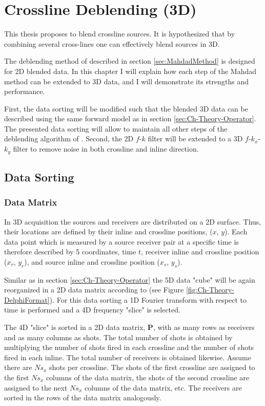 \chapter{Crossline Deblending (3D)} \label{chap:MahdadMethod3d}

This thesis proposes to blend crossline sources. It is hypothesized that by combining several cross-lines one can effectively blend sources in 3D.

The deblending method of \citet{Mahdad-Deblending-Method} described in section \ref{sec:MahdadMethod} is designed for 2D blended data. In this chapter I will explain how each step of the Mahdad method can be extended to 3D data, and I will demonstrate its strengths and  performance.

First, the data sorting will be modified such that the blended 3D data can be described using the same forward model as in section \ref{sec:Ch-Theory-Operator}. The presented data sorting will allow to maintain all other steps of the deblending algorithm of \citet{Mahdad-Deblending-Method}. Second, the 2D $f$-$k$ filter will be extended to a 3D $f$-$k_x$-$k_y$ filter to remove noise in both crossline and inline direction.

\section{Data Sorting} \label{sec:Ch-Theory-3dExtension-DataSorting}

\subsection*{Data Matrix}

In 3D acquisition the sources and receivers are distributed on a 2D surface. Thus, their locations are defined by their inline and crossline positions, ($x$, $y$). Each data point which is measured by a source receiver pair at a specific time is therefore described by 5 coordinates, time $t$, receiver inline and crossline position ($x_r$, $y_r$), and source inline and crossline position ($x_s$, $y_s$).

Similar as in section \ref{sec:Ch-Theory-Operator} the 5D data "cube" will be again reorganized in a 2D data matrix according to \citet{Delphi-Format} (see Figure \ref{fig:Ch-Theory-DelphiFormat}). For this data sorting a 1D Fourier transform with respect to time is performed and a 4D frequency "slice" is selected.

The 4D "slice" is sorted in a 2D data matrix, $\mathbf{P}$, with as many rows as receivers and as many columns as shots. The total number of shots is obtained by multiplying the number of shots fired in each crossline and the number of shots fired in each inline. The total number of receivers is obtained likewise. Assume there are $Ns_x$ shots per crossline. The shots of the first crossline are assigned to the first $Ns_x$ columns of the data matrix, the shots of the second crossline are assigned to the next $Ns_x$ columns of the data matrix, etc. The receivers are sorted in the rows of the data matrix analogously.


